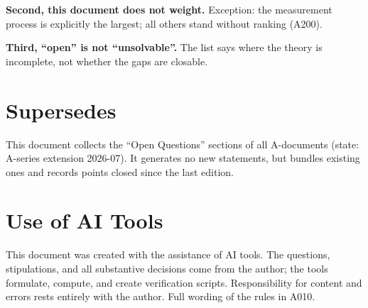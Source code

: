 \textbf{Second, this document does not weight.} Exception: the measurement process
is explicitly the largest; all others stand without ranking (A200).

\textbf{Third, ``open'' is not ``unsolvable''.} The list says where the theory is
incomplete, not whether the gaps are closable.

\section{Supersedes}

This document collects the ``Open Questions'' sections of all A-documents (state:
A-series extension 2026-07). It generates no new statements, but bundles existing
ones and records points closed since the last edition.

\section{Use of AI Tools}

This document was created with the assistance of AI tools. The questions,
stipulations, and all substantive decisions come from the author; the tools
formulate, compute, and create verification scripts.
Responsibility for content and errors rests entirely with the author.
Full wording of the rules in A010.
